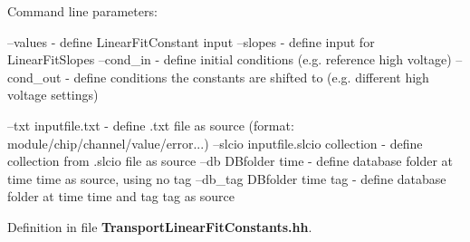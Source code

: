 Command line parameters\-: \begin{DoxyVerb}\e --values   -\> define LinearFitConstant input
\e --slopes   -\> define input for LinearFitSlopes
\e --cond_in  -\> define initial conditions (e.g. reference high voltage)
\e --cond_out -\> define conditions the constants are shifted to (e.g. different high voltage settings)

\e --txt    \<inputfile.txt\>                 -\> define .txt file as source (format: module/chip/channel/value/error...)
\e --slcio  \<inputfile.slcio\> \<collection\>  -\> define collection from .slcio file as source
\e --db     \<DBfolder\> \<time\>               -\> define database folder at time \<time\> as source, using no tag
\e --db_tag \<DBfolder\> \<time\> \<tag\>         -\> define database folder at time \<time\> and tag \<tag\> as source\end{DoxyVerb}


Definition in file {\bf Transport\-Linear\-Fit\-Constants.\-hh}.

